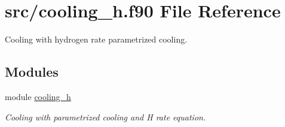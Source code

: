 \hypertarget{cooling__h_8f90}{}\section{src/cooling\+\_\+h.f90 File Reference}
\label{cooling__h_8f90}


Cooling with hydrogen rate parametrized cooling.  


\subsection*{Modules}
\begin{DoxyCompactItemize}
\item 
module \hyperlink{namespacecooling__h}{cooling\+\_\+h}
\begin{DoxyCompactList}\small\item\em Cooling with parametrized cooling and H rate equation. \end{DoxyCompactList}\end{DoxyCompactItemize}
